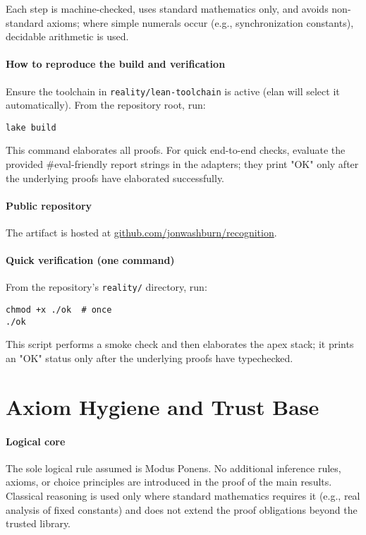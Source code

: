 \documentclass{article}
\newcommand{\FileRef}[1]{\texttt{#1}}
\begin{document}
Each step is machine-checked, uses standard mathematics only, and avoids non-standard axioms; where simple numerals occur (e.g., synchronization constants), decidable arithmetic is used.

\paragraph{How to reproduce the build and verification} Ensure the toolchain in \FileRef{reality/lean-toolchain} is active (elan will select it automatically). From the repository root, run:
\begin{lstlisting}
lake build
\end{lstlisting}
This command elaborates all proofs. For quick end-to-end checks, evaluate the provided #eval-friendly report strings in the adapters; they print "OK" only after the underlying proofs have elaborated successfully.

\paragraph{Public repository} The artifact is hosted at \href{https://github.com/jonwashburn/recognition}{github.com/jonwashburn/recognition}.

\paragraph{Quick verification (one command)} From the repository's \FileRef{reality/} directory, run:
\begin{lstlisting}
chmod +x ./ok  # once
./ok
\end{lstlisting}
This script performs a smoke check and then elaborates the apex stack; it prints an "OK" status only after the underlying proofs have typechecked.

\section{Axiom Hygiene and Trust Base}
\paragraph{Logical core} The sole logical rule assumed is Modus Ponens. No additional inference rules, axioms, or choice principles are introduced in the proof of the main results. Classical reasoning is used only where standard mathematics requires it (e.g., real analysis of fixed constants) and does not extend the proof obligations beyond the trusted library.
\end{document}
